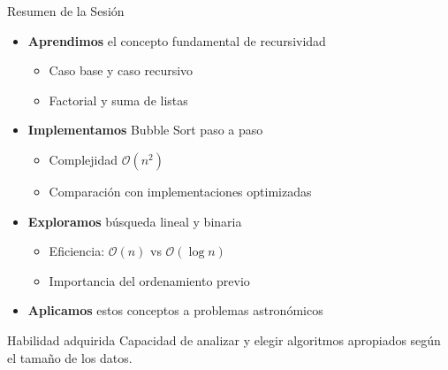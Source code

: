 \documentclass[10pt]{beamer}
\begin{document}
\begin{frame}{Resumen de la Sesión}
  \begin{itemize}
    \item \textbf{Aprendimos} el concepto fundamental de recursividad
      \begin{itemize}
        \item Caso base y caso recursivo
        \item Factorial y suma de listas
      \end{itemize}
    \item \textbf{Implementamos} Bubble Sort paso a paso
      \begin{itemize}
        \item Complejidad $\mathcal{O}(n^2)$
        \item Comparación con implementaciones optimizadas
      \end{itemize}
    \item \textbf{Exploramos} búsqueda lineal y binaria
      \begin{itemize}
        \item Eficiencia: $\mathcal{O}(n)$ vs $\mathcal{O}(\log n)$
        \item Importancia del ordenamiento previo
      \end{itemize}
    \item \textbf{Aplicamos} estos conceptos a problemas astronómicos
  \end{itemize}
  
  \begin{block}{Habilidad adquirida}
    Capacidad de analizar y elegir algoritmos apropiados según el tamaño de los datos.
  \end{block}
\end{frame}
\end{document}
